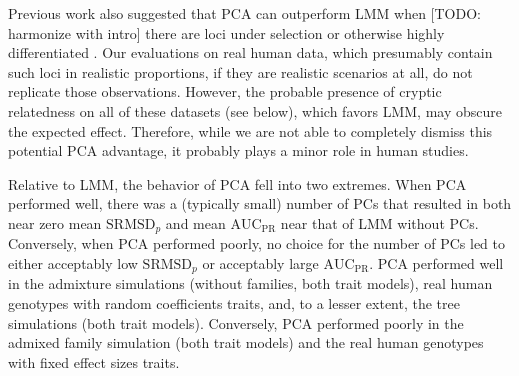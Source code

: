 \documentclass[11pt]{article}
\newcommand{\rmsd}{\text{SRMSD}_p}
\newcommand{\auc}{\text{AUC}_\text{PR}}
\begin{document}
Previous work also suggested that PCA can outperform LMM when [TODO: harmonize with intro] there are loci under selection or otherwise highly differentiated \citep{price_new_2010, wu_comparison_2011, yang_advantages_2014}.
Our evaluations on real human data, which presumably contain such loci in realistic proportions, if they are realistic scenarios at all, do not replicate those observations.
However, the probable presence of cryptic relatedness on all of these datasets (see below), which favors LMM, may obscure the expected effect.
Therefore, while we are not able to completely dismiss this potential PCA advantage, it probably plays a minor role in human studies.

Relative to LMM, the behavior of PCA fell into two extremes.
When PCA performed well, there was a (typically small) number of PCs that resulted in both near zero mean $\rmsd$ and mean $\auc$ near that of LMM without PCs.
Conversely, when PCA performed poorly, no choice for the number of PCs led to either acceptably low $\rmsd$ or acceptably large $\auc$.
PCA performed well in the admixture simulations (without families, both trait models), real human genotypes with random coefficients traits, and, to a lesser extent, the tree simulations (both trait models).
Conversely, PCA performed poorly in the admixed family simulation (both trait models) and the real human genotypes with fixed effect sizes traits.
\end{document}
